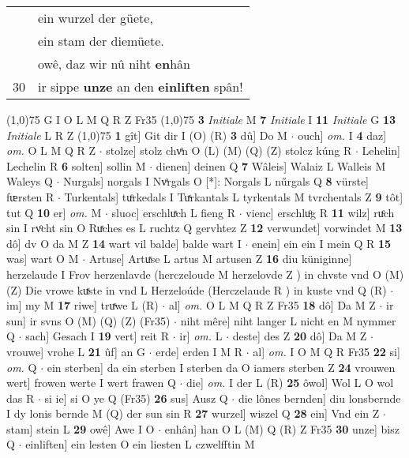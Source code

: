 \documentclass[8pt,a4paper,notitlepage]{article}
\begin{document}
\begin{table}[ht]
\begin{minipage}[t]{0.5\linewidth}
\begin{tabular}{rl}
 & ein wurzel der güete,\\ 
 & ein stam der diemüete.\\ 
 & owê, daz wir nû niht \textbf{en}hân\\ 
30 & ir sippe \textbf{unze} an den \textbf{einliften} spân!\\ 
\end{tabular}
\scriptsize
\line(1,0){75} \newline
G I O L M Q R Z Fr35 \newline
\line(1,0){75} \newline
\textbf{3} \textit{Initiale} M  \textbf{7} \textit{Initiale} I  \textbf{11} \textit{Initiale} G  \textbf{13} \textit{Initiale} L R Z  \newline
\line(1,0){75} \newline
\textbf{1} gît] Git dir I (O) (R) \textbf{3} dû] Do M  $\cdot$ ouch] \textit{om.} I \textbf{4} daz] \textit{om.} O L M Q R Z  $\cdot$ stolze] stolz chvͦn O (L) (M) (Q) (Z) stolcz kúng R  $\cdot$ Lehelin] Lechelin R \textbf{6} solten] sollin M  $\cdot$ dienen] deinen Q \textbf{7} Wâleis] Walaiz L Walleis M Waleys Q  $\cdot$ Nurgals] norgals I Nvͦrgals O [*]: Norgals L nűrgals Q \textbf{8} vürste] fᵫrsten R  $\cdot$ Turkentals] tuͦrkedals I Tuͯrkantals L tyrkentals M tvrchentals Z \textbf{9} tôt] tut Q \textbf{10} er] \textit{om.} M  $\cdot$ sluoc] erschluͯch L fieng R  $\cdot$ vienc] erschluͦg R \textbf{11} wilz] ruͤch sin I rvͦcht sin O Ruͯches es L ruchtz Q gervhtez Z \textbf{12} verwundet] vorwindet M \textbf{13} dô] dv O da M Z \textbf{14} wart vil balde] balde wart I  $\cdot$ enein] ein ein I mein Q R \textbf{15} was] wart O M  $\cdot$ Artuse] Artuͯse L artus M artusen Z \textbf{16} diu küniginne] herzelaude I Frov herzenlavde (herczeloude M herzelovde Z ) in chvste vnd O (M) (Z) Die vrowe kuͯste in vnd L Herzeloúde (Herczelaude R ) in kuste vnd Q (R)  $\cdot$ im] my M \textbf{17} riwe] truͯwe L (R)  $\cdot$ al] \textit{om.} O L M Q R Z Fr35 \textbf{18} dô] Da M Z  $\cdot$ ir sun] ir svns O (M) (Q) (Z) (Fr35)  $\cdot$ niht mêre] niht langer L nicht en M nymmer Q  $\cdot$ sach] Gesach I \textbf{19} vert] reit R  $\cdot$ ir] \textit{om.} L  $\cdot$ deste] des Z \textbf{20} dô] Da M Z  $\cdot$ vrouwe] vrohe L \textbf{21} ûf] an G  $\cdot$ erde] erden I M R  $\cdot$ al] \textit{om.} I O M Q R Fr35 \textbf{22} si] \textit{om.} Q  $\cdot$ ein sterben] da ein sterben I sterben da O iamers sterben Z \textbf{24} vrouwen wert] frowen werte I wert frawen Q  $\cdot$ die] \textit{om.} I der L (R) \textbf{25} ôwol] Wol L O wol das R  $\cdot$ si ie] si O ye Q (Fr35) \textbf{26} sus] Ausz Q  $\cdot$ die lônes bernden] diu lonsbernde I dy lonis bernde M (Q) der sun sin R \textbf{27} wurzel] wiszel Q \textbf{28} ein] Vnd ein Z  $\cdot$ stam] stein L \textbf{29} owê] Awe I O  $\cdot$ enhân] han O L (M) Q (R) Z Fr35 \textbf{30} unze] bisz Q  $\cdot$ einliften] ein lesten O ein liesten L czwelfftin M \newline

\end{minipage}
\end{table}
\end{document}
